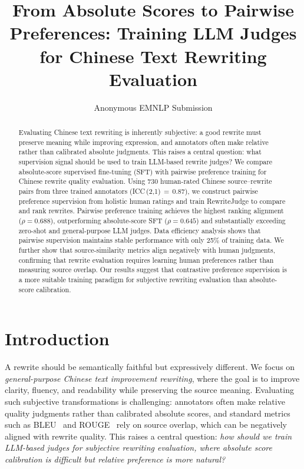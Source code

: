 \documentclass[11pt]{article}
\title{From Absolute Scores to Pairwise Preferences: Training LLM Judges for Chinese Text Rewriting Evaluation}
\author{
  Anonymous EMNLP Submission
}
\date{}
\begin{document}
\maketitle

\begin{abstract}
Evaluating Chinese text rewriting is inherently subjective: a good rewrite must preserve meaning while improving expression, and annotators often make relative rather than calibrated absolute judgments.
This raises a central question: what supervision signal should be used to train LLM-based rewrite judges? We compare absolute-score supervised fine-tuning (SFT) with pairwise preference training for Chinese rewrite quality evaluation.
Using 730 human-rated Chinese source--rewrite pairs from three trained annotators (ICC\,(2,1)\,$=$\,$0.87$), we construct pairwise preference supervision from holistic human ratings and train RewriteJudge to compare and rank rewrites.
Pairwise preference training achieves the highest ranking alignment ($\rho=0.688$), outperforming absolute-score SFT ($\rho=0.645$) and substantially exceeding zero-shot and general-purpose LLM judges.
Data efficiency analysis shows that pairwise supervision maintains stable performance with only 25\% of training data.
We further show that source-similarity metrics align negatively with human judgments, confirming that rewrite evaluation requires learning human preferences rather than measuring source overlap.
Our results suggest that contrastive preference supervision is a more suitable training paradigm for subjective rewriting evaluation than absolute-score calibration.
\end{abstract}

\section{Introduction}
\label{sec:intro}

A rewrite should be semantically faithful but expressively different.
We focus on \emph{general-purpose Chinese text improvement rewriting}, where the goal is to improve clarity, fluency, and readability while preserving the source meaning.
Evaluating such subjective transformations is challenging: annotators often make relative quality judgments rather than calibrated absolute scores, and standard metrics such as BLEU~\citep{papineni2002bleu} and ROUGE~\citep{lin2004rouge} rely on source overlap, which can be negatively aligned with rewrite quality.
This raises a central question: \emph{how should we train LLM-based judges for subjective rewriting evaluation, where absolute score calibration is difficult but relative preference is more natural?}
\end{document}
